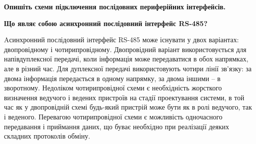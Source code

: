 \documentclass[a4paper,14pt]{extreport}
\begin{document}
\begin{tcolorbox}[colback=magenta!5!white!100,colframe=magenta!70!black!90,width=19cm,righttitle=0.5cm,
title= \center{\Large{\textbf{5}}}]
\begin{center}\bf{Опишіть схеми підключення послідовних периферійних інтерфейсів.}\end{center}
\tcblower
{}
\end{tcolorbox}



\begin{tcolorbox}[colback=gray!5!white!100,colframe=gray!75!black!90,width=19cm,righttitle=0.5cm,
title= \center{\Large{\textbf{6}}}]
\begin{center}\bf{Що являє собою асинхронний послідовний інтерфейс RS-485?}\end{center}
\tcblower
Aсинхронний послідовний iнтерфейс RS-485 може існувати у двох варіантах: двопровідному і чотирипровідному. Двопровідний варіант використовується для напівдуплексної передачі, коли інформація може передаватися в обох напрямках, але в різний час. Для дуплексної передачі використовують чотири лінії зв'язку: за двома інформація передається в одному напрямку, за двома іншими – в зворотному. Недоліком чотирипровідної схеми є необхідність жорсткого визначення ведучого і ведених пристроїв на стадії проектування системи, в
той час як у двопровідній схемі будь-який пристрій може бути як в ролі ведучого, так і веденого. Перевагою чотирипровідної схеми є можливість одночасного передавання і приймання даних, що буває необхідно при реалізації деяких складних протоколів обміну.
\end{tcolorbox}
\end{document}
